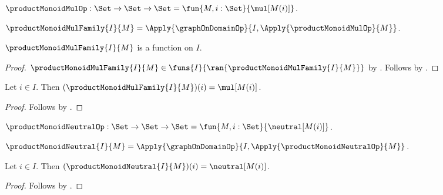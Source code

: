 \begin{definition}\label{product_monoid_mul_op}
    $\productMonoidMulOp:\Set\to\Set\to\Set
        =\fun{M,i:\Set}{\mul[M(i)]}$.
\end{definition}

\begin{definition}\label{product_monoid_mul_family}
    $\productMonoidMulFamily{I}{M}
        =\Apply{\graphOnDomainOp}{
            I,\Apply{\productMonoidMulOp}{M}}$.
\end{definition}

\begin{proposition}\label{product_monoid_mul_family_type}
    $\productMonoidMulFamily{I}{M}$ is a function on $I$.
\end{proposition}
\begin{proof}
    $\productMonoidMulFamily{I}{M}\in
        \funs{I}{\ran{\productMonoidMulFamily{I}{M}}}$ by
        .
    Follows by .
\end{proof}

\begin{proposition}\label{product_monoid_mul_family_apply}
    Let $i\in I$.
    Then $(\productMonoidMulFamily{I}{M})(i)=\mul[M(i)]$.
\end{proposition}
\begin{proof}
    Follows by
        .
\end{proof}

\begin{definition}\label{product_monoid_neutral_op}
    $\productMonoidNeutralOp:\Set\to\Set\to\Set
        =\fun{M,i:\Set}{\neutral[M(i)]}$.
\end{definition}

\begin{definition}\label{product_monoid_neutral}
    $\productMonoidNeutral{I}{M}
        =\Apply{\graphOnDomainOp}{
            I,\Apply{\productMonoidNeutralOp}{M}}$.
\end{definition}

\begin{proposition}\label{product_monoid_neutral_coordinate}
    Let $i\in I$.
    Then
        $(\productMonoidNeutral{I}{M})(i)=\neutral[M(i)]$.
\end{proposition}
\begin{proof}
    Follows by
        .
\end{proof}

